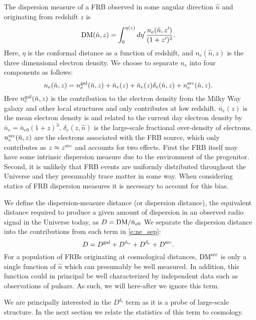 \documentclass[onecolumn,prd,noshowpacs,nofootinbib,amsmath,amssymb]{revtex4}
\begin{document}
The dispersion measure of a FRB observed in some angular direction $\hat{n}$ and
originating from redshift $z$ is
\begin{equation}
    {\rm DM}(\hat{n}, z) = \int_0^{\eta(z)} d\eta'
        \frac{n_e(\hat{n}, z')}{(1+z')^2}.
\end{equation}
Here, $\eta$ is the conformal distance as a function of redshift, and
$n_e(\hat{n}, z)$ is the three dimensional electron density.  We choose to
separate $n_e$ into four components as follows:
\begin{equation}
\label{e:ne_sep}
n_e(\hat{n}, z) = n_e^{\rm gal}(\hat{n}, z) + \bar{n}_e(z) +
    \bar{n}_e(z)\delta_e(\hat{n}, z) + n_e^{\rm src}(\hat{n}, z).
\end{equation}
Here $n_e^{\rm gal}(\hat{n}, z)$ is the contribution to the electron density
from the Milky Way galaxy and other local structures and only contributes at
low redshift. $\bar{n}_e(z)$ is the mean electron density is and related to the
current day electron density by $\bar{n}_e = \bar{n}_{e0} (1+z)^3$. 
$\delta_e(z,\hat{n})$ is the large-scale fractional over-density of electrons.
$n_e^{\rm src}(\hat{n}, z)$ are the electrons associated with the FRB source,
which only contributes as $z \approx z^{\rm src}$ and accounts for two effects.
First the FRB itself
may have some intrinsic dispersion measure due to the environment of the
progenitor.  Second, it is unlikely that FRB events are uniformly distributed
throughout the Universe and they presumably trace matter in some way. When
considering statics of FRB dispersion measures it is necessary to account for
this bias.

We define the dispersion-measure distance (or dispersion distance),
the equivalent distance required to
produce a given amount of dispersion in an observed radio signal in the
Universe today, as $ D = {{\rm DM}}/{\bar{n}_{e0}}$
We separate the dispersion distance into the contributions from each
term in \ref{e:ne_sep}:
\begin{equation}
\label{e:D_sep}
D = D^{\rm gal} + D^{\bar{n}_e} + D^{\delta_e} + D^{\rm src}.
\end{equation}
For a population of FRBs originating at cosmological distances, ${\rm DM}^{\rm
src}$ is only a single function of $\hat{n}$ which can presumably be well
measured.  In addition, this function could in principal be well characterized
by independent data such as observations of pulsars.  As such, we will
here-after we ignore this term.

We are principally interested in the $D^{\delta_e}$ term as it is a probe of
large-scale structure. In the next section we relate the statistics of this
term to cosmology.
\end{document}
